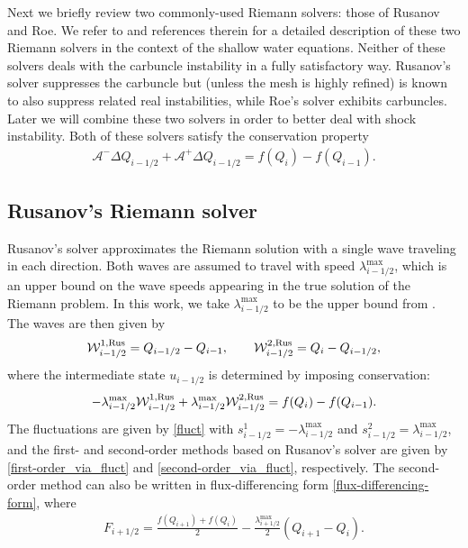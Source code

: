 \documentclass[preprint, 11pt]{article}
\newcommand{\W}{{\mathcal W}}
\newcommand{\A}{{\mathcal A}}
\newcommand{\apdq}{\A^+ \!\!{\Delta} Q}
\newcommand{\amdq}{\A^- \!\!{\Delta} Q}
\newcommand{\imh}{{i-1/2}}
\newcommand{\bff}{{f}}
\newcommand{\bfF}{{F}}
\newcommand{\bfu}{{u}}
\newcommand{\bfq}{{Q}}
\newcommand{\Rus}{{\rm Rus}}
\begin{document}
Next we briefly review two commonly-used Riemann solvers: those of Rusanov and
Roe.  We refer to \cite{ketcheson2020riemann} and references therein for
a detailed description of these two Riemann solvers in the context of
the shallow water equations.
Neither of these solvers deals with the carbuncle instability in a fully
satisfactory way.  Rusanov's solver suppresses the carbuncle but 
(unless the mesh is highly refined)
is known to
also suppress related real instabilities, while Roe's solver exhibits carbuncles.
Later we will combine these two solvers in order to better deal with shock instability.
Both of these solvers satisfy the conservation property
\begin{align} \label{rs_conservation}
    \amdq_\imh + \apdq_\imh = \bff(\bfq_i) - \bff(\bfq_{i-1}).
\end{align}


\subsection{Rusanov's Riemann solver}\label{sec:rusanov}
Rusanov's solver approximates the Riemann solution with a single wave traveling in each
direction.  Both waves are assumed to travel with speed $\lambda^{\max}_\imh$, which is an
upper bound on the wave speeds appearing in the true solution of the Riemann problem.
In this work, we take $\lambda_{i-1/2}^{\max}$ to be the upper bound
from \cite[Prop. 3.7]{azerad2017well}.
The waves are then given by
\begin{align}\label{rusanov_waves}
  \W_{i-1/2}^{1,\Rus}=\bfq_{i-1/2}-\bfq_{i-1}, \qquad
  \W_{i-1/2}^{2,\Rus}=\bfq_{i}-\bfq_{i-1/2},
\end{align}
where the intermediate state $\bfu_{i-1/2}$ is determined by imposing conservation:
\begin{align}\label{rus_cons}
  -\lambda_{i-1/2}^{\max}\W_{i-1/2}^{1,\Rus}+\lambda_{i-1/2}^{\max}\W_{i-1/2}^{2,\Rus} = \bff(\bfq_{i})-\bff(\bfq_{i-1}).
\end{align}
The fluctuations are given by \eqref{fluct} with $s_{i-1/2}^1=-\lambda_{i-1/2}^{\max}$
and $s_{i-1/2}^2=\lambda_{i-1/2}^{\max}$, and the first- and second-order methods based
on Rusanov's solver are given by \eqref{first-order_via_fluct} and \eqref{second-order_via_fluct}, respectively.
{\color{red}
  The second-order method can also be written in flux-differencing form \eqref{flux-differencing-form}, where 
  \begin{align}\label{first-order_fluxes_LLF}
    \bfF_{i+1/2} = \frac{\bff(\bfq_{i+1})+\bff(\bfq_i)}{2}
    - \frac{\lambda_{i+1/2}^{\max}}{2}(\bfq_{i+1}-\bfq_{i}).
  \end{align}
}
\end{document}
